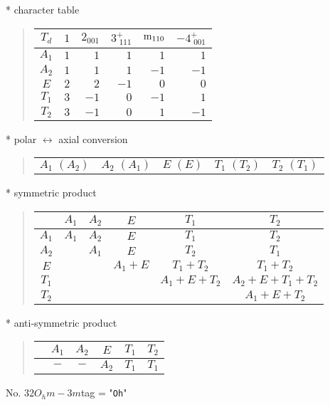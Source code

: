 \documentclass[fleqn,10pt,landscape]{jsarticle}
\begin{document}
* character table
\begin{quote}
\begin{tabular}{crrrrr} \hline \hline
$ T_{d} $ & $ 1 $ & $ 2{}_{001} $ & $ 3^{+}_{\,\,111} $ & $ {\rm m}_{110} $ & $ -4^{+}_{\,\,001} $ \\ \hline
$ A_{1} $ & $ 1 $ & $ 1 $ & $ 1 $ & $ 1 $ & $ 1 $ \\
$ A_{2} $ & $ 1 $ & $ 1 $ & $ 1 $ & $ -1 $ & $ -1 $ \\
$ E $ & $ 2 $ & $ 2 $ & $ -1 $ & $ 0 $ & $ 0 $ \\
$ T_{1} $ & $ 3 $ & $ -1 $ & $ 0 $ & $ -1 $ & $ 1 $ \\
$ T_{2} $ & $ 3 $ & $ -1 $ & $ 0 $ & $ 1 $ & $ -1 $ \\
 \hline \hline
\end{tabular}
\end{quote}
* polar $\leftrightarrow$ axial conversion
\begin{quote}
\begin{tabular}{ccccc}
$ A_{1}\,\,(A_{2}) $ & $ A_{2}\,\,(A_{1}) $ & $ E\,\,(E) $ & $ T_{1}\,\,(T_{2}) $ & $ T_{2}\,\,(T_{1}) $
\end{tabular}
\end{quote}
* symmetric product
\begin{quote}
\begin{tabular}{c|ccccc} \hline \hline
 & $ A_{1} $ & $ A_{2} $ & $ E $ & $ T_{1} $ & $ T_{2} $ \\ \hline
$ A_{1} $ & $ A_{1} $ & $ A_{2} $ & $ E $ & $ T_{1} $ & $ T_{2} $ \\
$ A_{2} $ & $  $ & $ A_{1} $ & $ E $ & $ T_{2} $ & $ T_{1} $ \\
$ E $ & $  $ & $  $ & $ A_{1} + E $ & $ T_{1} + T_{2} $ & $ T_{1} + T_{2} $ \\
$ T_{1} $ & $  $ & $  $ & $  $ & $ A_{1} + E + T_{2} $ & $ A_{2} + E + T_{1} + T_{2} $ \\
$ T_{2} $ & $  $ & $  $ & $  $ & $  $ & $ A_{1} + E + T_{2} $ \\
 \hline \hline
\end{tabular}
\end{quote}
* anti-symmetric product
\begin{quote}
\begin{tabular}{cccccc} \hline \hline
 & $ A_{1} $ & $ A_{2} $ & $ E $ & $ T_{1} $ & $ T_{2} $ \\ \hline
$  $ & $ - $ & $ - $ & $ A_{2} $ & $ T_{1} $ & $ T_{1} $ \\
 \hline \hline
\end{tabular}
\end{quote}
\newpage
No. 32\quad$O_{h}$\quad$m-3m$\quad[ cubic ]
tag = "{\tt Oh}"
\end{document}
